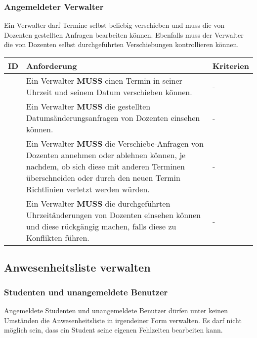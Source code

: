 \subsubsection{Angemeldeter Verwalter}

Ein Verwalter darf Termine selbst beliebig verschieben und muss die von Dozenten gestellten Anfragen bearbeiten können. Ebenfalls muss der Verwalter die von Dozenten selbst durchgeführten Verschiebungen kontrollieren können.

\vspace{12pt}

\begin{tabular} {|p{}|p{}|p{}|}
	\hline
	ID & Anforderung & Kriterien \\
	\hline
	\printfreqnr
	& Ein Verwalter \textbf{MUSS} einen Termin in seiner Uhrzeit und seinem Datum verschieben können.
	& - \\
	\hline
	\printfreqnr
	& Ein Verwalter \textbf{MUSS} die gestellten Datumsänderungsanfragen von Dozenten einsehen können.
	& - \\
	\hline
	\printfreqnr
	& Ein Verwalter \textbf{MUSS} die Verschiebe-Anfragen von Dozenten annehmen oder ablehnen können, je nachdem, ob sich diese mit anderen Terminen überschneiden oder durch den neuen Termin Richtlinien verletzt werden würden.
	& - \\
	\hline
	\printfreqnr
	& Ein Verwalter \textbf{MUSS} die durchgeführten Uhrzeitänderungen von Dozenten einsehen können und diese rückgängig machen, falls diese zu Konflikten führen.
	& - \\
	\hline
\end{tabular}

\newpage

\subsection{Anwesenheitsliste verwalten}

\subsubsection{Studenten und unangemeldete Benutzer}
Angemeldete Studenten und unangemeldete Benutzer dürfen unter keinen Umständen die Anwesenheitsliste in irgendeiner Form verwalten. Es darf nicht möglich sein, dass ein Student seine eigenen Fehlzeiten bearbeiten kann.

\vspace{12pt}


